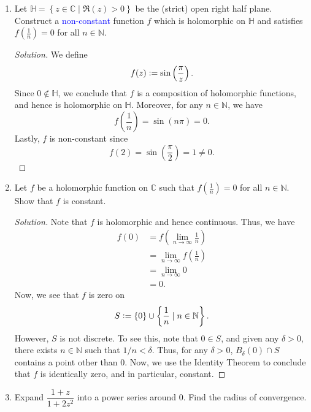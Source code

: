 \documentclass[11pt]{article}
\theoremstyle{definition}
\newenvironment{soln}{\begin{proof}[Solution]}{\end{proof}}
\begin{document}
\begin{enumerate}[leftmargin=*]
\item Let $\mathbb{H} = \left\{ z \in \mathbb{C} \mid \mathfrak{R}(z) > 0 \right\}$ be the (strict) open right half plane. Construct a \textcolor{blue}{non-constant} function $f$ which is holomorphic on $\mathbb{H}$ and satisfies $f\left( \frac{1}{n} \right) = 0$ for all $n \in \mathbb{N}$.

\begin{soln}
We define 
\[
    f(z) \vcentcolon= \sin\left( \frac{\pi}{z} \right).
\]
Since $0 \notin \mathbb{H}$, we conclude that $f$ is a composition of holomorphic functions, and hence is holomorphic on $\mathbb{H}$. Moreover, for any $n \in \mathbb{N}$, we have
\[
    f\left( \frac{1}{n} \right) = \sin(n\pi) = 0.
\]
Lastly, $f$ is non-constant since
\[
    f(2) = \sin\left( \frac{\pi}{2} \right) = 1 \neq 0.
\]
\end{soln}

\item Let $f$ be a holomorphic function on $\mathbb{C}$ such that $f\left( \frac{1}{n} \right) = 0$ for all $n \in \mathbb{N}$. Show that $f$ is constant.

\begin{soln}
Note that $f$ is holomorphic and hence continuous. Thus, we have
\begin{align*}
    f(0) &= f \left( \lim_{n \to \infty} \frac{1}{n} \right) \\
    &= \lim_{n \to \infty} f\left( \frac{1}{n} \right) \\
    &= \lim_{n \to \infty} 0 \\
    &= 0.
\end{align*}
Now, we see that $f$ is zero on
\[
    S \vcentcolon= \left\{ 0 \right\} \cup \left\{ \frac{1}{n} \mid n \in \mathbb{N} \right\}.
\]
However, $S$ is not discrete. To see this, note that $0 \in S$, and given any $\delta > 0$, there exists $n \in \mathbb{N}$ such that $1/n < \delta$. Thus, for any $\delta > 0$, $B_{\delta}(0) \cap S$ contains a point other than $0$. Now, we use the Identity Theorem to conclude that $f$ is identically zero, and in particular, constant.
\end{soln}

\item Expand $\dfrac{1+z}{1+2z^2}$ into a power series around $0$. Find the radius of convergence. 


\end{enumerate}
\end{document}

